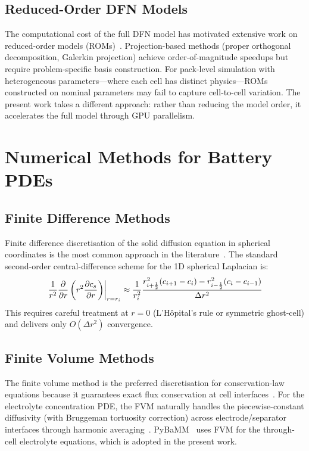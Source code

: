 \subsection{Reduced-Order DFN Models}
\label{ssec:reduced_dfn}

The computational cost of the full DFN model has motivated extensive work on reduced-order models (ROMs)~\cite{Moura2017,DiDomenico2010,Cai2011}. Projection-based methods (proper orthogonal decomposition, Galerkin projection) achieve order-of-magnitude speedups but require problem-specific basis construction. For pack-level simulation with heterogeneous parameters---where each cell has distinct physics---ROMs constructed on nominal parameters may fail to capture cell-to-cell variation. The present work takes a different approach: rather than reducing the model order, it accelerates the full model through GPU parallelism.

\section{Numerical Methods for Battery PDEs}
\label{sec:lit_numerics}

\subsection{Finite Difference Methods}
\label{ssec:lit_fdm}

Finite difference discretisation of the solid diffusion equation in spherical coordinates is the most common approach in the literature~\cite{Doyle1993}. The standard second-order central-difference scheme for the 1D spherical Laplacian is:
\begin{equation}
  \left.\frac{1}{r^2}\dfrac{\partial }{\partial r}\left(r^2 \dfrac{\partial c_s}{\partial r}\right)\right|_{r=r_i} \approx \frac{1}{r_i^2} \frac{r_{i+\frac{1}{2}}^2(c_{i+1}-c_i) - r_{i-\frac{1}{2}}^2(c_i - c_{i-1})}{\Delta r^2}
  \label{eq:fdm_spherical}
\end{equation}
This requires careful treatment at $r=0$ (L'Hôpital's rule or symmetric ghost-cell) and delivers only $O(\Delta r^2)$ convergence.

\subsection{Finite Volume Methods}
\label{ssec:lit_fvm}

The finite volume method is the preferred discretisation for conservation-law equations because it guarantees exact flux conservation at cell interfaces~\cite{LeVeque2002}. For the electrolyte concentration PDE, the FVM naturally handles the piecewise-constant diffusivity (with Bruggeman tortuosity correction) across electrode/separator interfaces through harmonic averaging~\cite{Torchio2016}. PyBaMM~\cite{Sulzer2021} uses FVM for the through-cell electrolyte equations, which is adopted in the present work.

